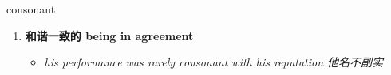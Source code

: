 
\begin{frame}
{\huge consonant}
\begin{center}
\begin{enumerate}\Large
  \item \textbf{和谐一致的 being in agreement}
  \begin{itemize}
    \item \em{\Large{his performance was rarely consonant with his reputation 他名不副实}}
  \end{itemize}
\end{enumerate}
\end{center}
\end{frame}
